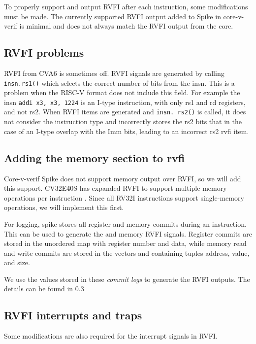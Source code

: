 To properly support  and output RVFI after each instruction, some modifications must be made. The currently supported RVFI output added to Spike in core-v-verif is minimal and does not always match the RVFI output from the core.



\subsection{RVFI problems}
RVFI from CVA6 is sometimes off. RVFI signals are generated by calling \lstinline{insn.rs1()} which selects the correct number of bits from the insn. This is a problem when the RISC-V format does not include this field. For example the insn \lstinline{addi x3, x3, 1224} is an I-type instruction, with only rs1 and rd registers, and not rs2. When RVFI items are generated and \lstinline{insn. rs2()} is called, it does not consider the instruction type and incorrectly stores the rs2 bits that in the case of an I-type overlap with the Imm bits, leading to an incorrect rs2 rvfi item.


\subsection{Adding the memory section to rvfi}

Core-v-verif Spike does not support memory output over RVFI, so we will add this support. 
CV32E40S has expanded RVFI to support multiple memory operations per instruction \cite{openhwgroupRISCVFormalInterface2023}. Since all RV32I instructions support single-memory operations, we will implement this first.

For logging, spike stores all register and memory commits during an instruction. This can be used to generate the  and memory RVFI signals. Register commits are stored in the unordered map  with register number and data, while memory read and write commits are stored in the vectors  and  containing tuples address, value, and size.

We use the values stored in these \textit{commit logs} to generate the RVFI outputs. The details can be found in \ref{}

\subsection{RVFI interrupts and traps}

Some modifications are also required for the interrupt signals in RVFI.


